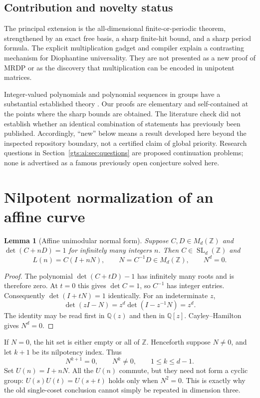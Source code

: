 \documentclass[11pt,letterpaper]{article}
\newtheorem{lemma}[theorem]{Lemma}
\theoremstyle{definition}
\theoremstyle{remark}
\newcommand{\Z}{\mathbb Z}
\newcommand{\SL}{\operatorname{SL}}
\newcommand{\Q}{\mathbb Q}
\begin{document}
\subsection{Contribution and novelty status}
The principal extension is the all-dimensional finite-or-periodic theorem, strengthened by an exact free basis, a sharp finite-hit bound, and a sharp period formula. The explicit multiplication gadget and compiler explain a contrasting mechanism for Diophantine universality. They are not presented as a new proof of MRDP or as the discovery that multiplication can be encoded in unipotent matrices.

Integer-valued polynomials and polynomial sequences in groups have a substantial established theory \cite{ai-cahenchabert,ai-leibman,ai-hu}. Our proofs are elementary and self-contained at the points where the sharp bounds are obtained. The literature check did not establish whether an identical combination of statements has previously been published. Accordingly, ``new'' below means a result developed here beyond the inspected repository boundary, not a certified claim of global priority. Research questions in Section~\ref{gts:ai:sec:questions} are proposed continuation problems; none is advertised as a famous previously open conjecture solved here.

\section{Nilpotent normalization of an affine curve}\label{gts:ai:sec:normal}
\begin{lemma}[Affine unimodular normal form]\label{gts:ai:lem:normal}
Suppose $C,D\in M_d(\Z)$ and $\det(C+nD)=1$ for infinitely many integers $n$. Then $C\in\SL_d(\Z)$ and
\[
 L(n)=C(I+nN),\qquad N=C^{-1}D\in M_d(\Z),\qquad N^d=0.
\]
\end{lemma}
\begin{proof}
The polynomial $\det(C+tD)-1$ has infinitely many roots and is therefore zero. At $t=0$ this gives $\det C=1$, so $C^{-1}$ has integer entries. Consequently $\det(I+tN)=1$ identically. For an indeterminate $z$,
\[
 \det(zI-N)=z^d\det(I-z^{-1}N)=z^d.
\]
The identity may be read first in $\Q(z)$ and then in $\Q[z]$. Cayley--Hamilton gives $N^d=0$.
\end{proof}
If $N=0$, the hit set is either empty or all of $\Z$. Henceforth suppose $N\ne0$, and let $k+1$ be its nilpotency index. Thus
\begin{equation}\label{gts:ai:eq:index}
 N^{k+1}=0,\qquad N^k\ne0,\qquad 1\le k\le d-1.
\end{equation}
Set $U(n)=I+nN$. All the $U(n)$ commute, but they need not form a cyclic group: $U(s)U(t)=U(s+t)$ holds only when $N^2=0$. This is exactly why the old single-coset conclusion cannot simply be repeated in dimension three.
\end{document}
